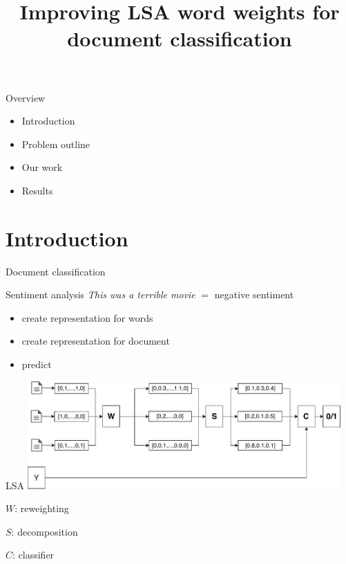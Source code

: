 \documentclass[xcolor={table}]{beamer}
\title[eLSA]{Improving LSA word weights for document classification}
\author[Macko, Malinovska] %
{Bc. Vladimír Macko\inst{1} \\ \\ \and {\tiny supervisor: RNDr. Kristína Malinovská, PhD.\inst{1} \\ \and consultant: RNDr. Radim Řehůřek, Ph.D.}}
\institute[VFU] %
{
  \inst{1}%
  Comenius University\\
  Faculty of Mathematics, Physics and Informatics
}
\begin{document}
        
\begin{frame}
    \titlepage
\end{frame}
    
\begin{frame}{Overview}
    \begin{block}{}
        \begin{itemize}
            \item Introduction
            \item Problem outline
            \item Our work
            \item Results
        \end{itemize}
    \end{block}
\end{frame}

\section{Introduction}
\begin{frame}{Document classification}
    \begin{block}{Sentiment analysis}
        \emph{This was a terrible movie} $=$ negative sentiment
    \end{block}
    
    \begin{block}{}   
        \begin{itemize}
            \item create representation for words
            \item create representation for document
            \item predict
        \end{itemize}
    \end{block}
\end{frame} 

\begin{frame}{LSA}
    \includegraphics[width=0.9\textwidth]{LSA.pdf}
    \begin{block}
        
        $W$: reweighting

        $S$: decomposition
        
        $C$: classifier
    \end{block}
\end{frame}
\end{document}
